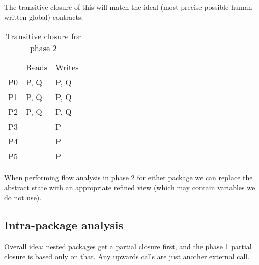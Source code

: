 \documentclass{article}
\begin{document}
\noindent
The transitive closure of this will match the ideal (most-precise possible
human-written global) contracts:

\begin{table}[h]
  \begin{center}
    \begin{tabular}{lll}
         & Reads & Writes \\
      P0 & P, Q  & P, Q   \\
      P1 & P, Q  & P, Q   \\
      P2 & P, Q  & P, Q   \\
      P3 &       & P      \\
      P4 &       & P      \\
      P5 &       & P      \\
    \end{tabular}
  \end{center}
  \caption{Transitive closure for phase 2}
\end{table}

\noindent
When performing flow analysis in phase 2 for either package we can replace
the abstract state with an appropriate refined view (which may contain
variables we do not use).

\newpage
\subsection{Intra-package analysis}
Overall idea: nested packages get a partial closure first, and the phase 1
partial closure is based only on that. Any upwards calls are just
another external call.
\end{document}
